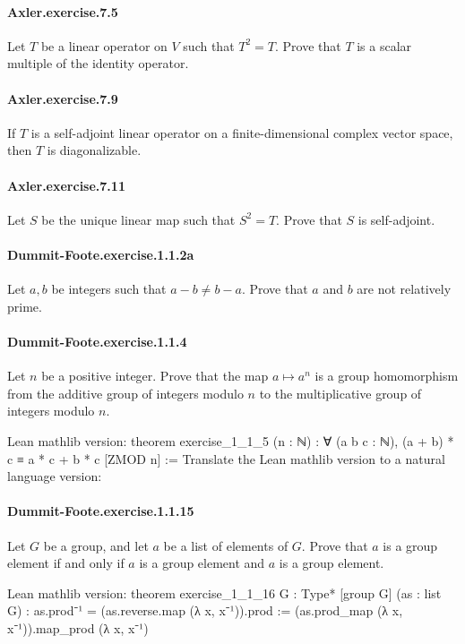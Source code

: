 \documentclass{article}
\begin{document}
\paragraph{Axler.exercise.7.5} Let $T$ be a linear operator on $V$ such that $T^2 = T$. Prove that $T$ is a scalar multiple of the identity operator.

\paragraph{Axler.exercise.7.9} If $T$ is a self-adjoint linear operator on a finite-dimensional complex vector space, then $T$ is diagonalizable.

\paragraph{Axler.exercise.7.11} Let $S$ be the unique linear map such that $S^2 = T$. Prove that $S$ is self-adjoint.

\paragraph{Dummit-Foote.exercise.1.1.2a} Let $a, b$ be integers such that $a - b \neq b - a$. Prove that $a$ and $b$ are not relatively prime.

\paragraph{Dummit-Foote.exercise.1.1.4} Let $n$ be a positive integer. Prove that the map $a \mapsto a^n$ is a group homomorphism from the additive group of integers modulo $n$ to the multiplicative group of integers modulo $n$.

Lean mathlib version:
theorem exercise_1_1_5 (n : ℕ) : 
  ∀ (a b c : ℕ), (a + b) * c ≡ a * c + b * c [ZMOD n] :=
Translate the Lean mathlib version to a natural language version: 

\paragraph{Dummit-Foote.exercise.1.1.15} Let $G$ be a group, and let $a$ be a list of elements of $G$. Prove that $a$ is a group element if and only if $a$ is a group element and $a$ is a group element.

Lean mathlib version:
theorem exercise_1_1_16 {G : Type*} [group G] (as : list G) :
  as.prod⁻¹ = (as.reverse.map (λ x, x⁻¹)).prod :=
(as.prod_map (λ x, x⁻¹)).map_prod (λ x, x⁻¹)
\end{document}
